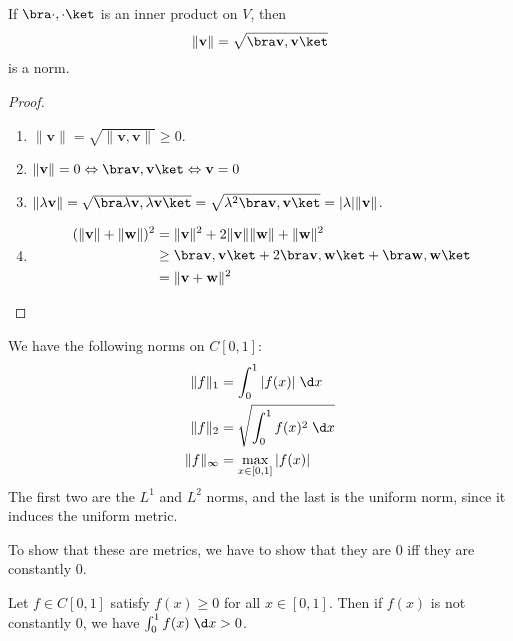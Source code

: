 \documentclass[a4paper]{article}
\begin{document}
\begin{lemma}
  If $\bra \cdot, \cdot \ket$ is an inner product on $V$, then
  \[
    \|\mathbf{v}\| = \sqrt{\bra \mathbf{v}, \mathbf{v}\ket}
  \]
  is a norm.
\end{lemma}

\begin{proof}\leavevmode
  \begin{enumerate}
    \item $\|\mathbf{v}\| = \sqrt{\|\mathbf{v}, \mathbf{v}\|} \geq 0$.
    \item $\|\mathbf{v}\| = 0\Leftrightarrow \bra \mathbf{v}, \mathbf{v}\ket \Leftrightarrow \mathbf{v} = 0$
    \item $\|\lambda \mathbf{v}\| = \sqrt{\bra \lambda \mathbf{v}, \lambda \mathbf{v}\ket} = \sqrt{\lambda^2 \bra \mathbf{v}, \mathbf{v}\ket} = |\lambda| \|\mathbf{v}\|$.
    \item 
      \begin{align*}
        (\|\mathbf{v}\| + \|\mathbf{w}\|)^2 &= \|\mathbf{v}\|^2 + 2\|\mathbf{v}\|\|\mathbf{w}\| + \|\mathbf{w}\|^2\\
        &\geq \bra \mathbf{v}, \mathbf{v}\ket + 2\bra \mathbf{v}, \mathbf{w}\ket + \bra \mathbf{w}, \mathbf{w}\ket \\
        &= \|\mathbf{v} + \mathbf{w}\|^2
      \end{align*}
  \end{enumerate}
\end{proof}

\begin{eg}
  We have the following norms on $C[0, 1]$:
  \begin{align*}
    \|f\|_1 &= \int_0^1 |f(x)|\;\d x\\
    \|f\|_2 &= \sqrt{\int_0^1 f(x)^2 \;\d x}\\
    \|f\|_{\infty} &= \max_{x \in [0, 1]}|f(x)|
  \end{align*}
  The first two are the $L^1$ and $L^2$ norms, and the last is the uniform norm, since it induces the uniform metric.

  To show that these are metrics, we have to show that they are $0$ iff they are constantly $0$.
\end{eg}

\begin{lemma}
  Let $f\in C[0, 1]$ satisfy $f(x) \geq 0$ for all $x\in [0, 1]$. Then if $f(x)$ is not constantly $0$, we have $\int_0^1 f(x)\;\d x > 0$.
\end{lemma}
\end{document}
